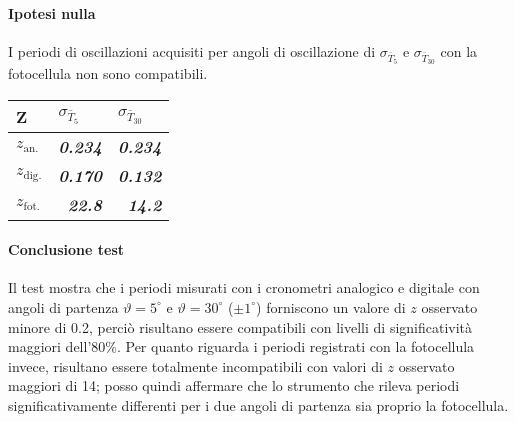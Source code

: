 \documentclass{article}
\begin{document}
	\paragraph{Ipotesi nulla} I periodi di oscillazioni acquisiti per angoli di oscillazione di $\sigma_{\bar{T}_5}$ e $\sigma_{\bar{T}_30}$ con la fotocellula non sono compatibili.
	
	\begin{table}[H]
		\centering
		\begin{tabular}{@{}lrr@{}}
			\toprule
			Z & \multicolumn{1}{l}{$\sigma_{\bar{T}_5}$} & \multicolumn{1}{l}{$\sigma_{\bar{T}_{30}}$} \\ \midrule
			$z_{\text{an.}}$      & \textit{\textbf{0.234}}                  & \textit{\textbf{0.234}}                   \\
			$z_{\text{dig.}}$     & \textit{\textbf{0.170}}                  & \textit{\textbf{0.132}}                   \\
			$z_{\text{fot.}}$     & \textit{\textbf{22.8}}                   & \textit{\textbf{14.2}}                    \\ \bottomrule
		\end{tabular}
	\end{table}
	
	\paragraph{Conclusione test}
	Il test mostra che i periodi misurati con i cronometri analogico e digitale con angoli di partenza $\vartheta = 5^\circ$ e $\vartheta = 30^\circ$ ($\pm 1^\circ$) forniscono un valore di $z$ osservato minore di 0.2, perciò  risultano essere compatibili con livelli di significatività maggiori dell'80\%. Per quanto riguarda i periodi registrati con la fotocellula invece, risultano essere totalmente incompatibili con valori di $z$ osservato maggiori di 14; posso quindi affermare che lo strumento che rileva periodi significativamente differenti per i due angoli di partenza sia proprio la fotocellula.
	
	
	
	
	
	
	
	
	
	\newpage
\end{document}
